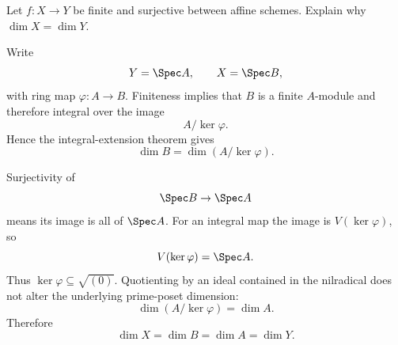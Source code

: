 \begin{problem}\label{prob:vi30-17}
Let \(f:X\to Y\) be finite and surjective between affine schemes. Explain why \(\dim X=\dim Y\).

\end{problem}

\ifdefined\FullProblemDossiers
\begin{solution}
Write
\[
Y=\Spec A,\qquad X=\Spec B,
\]
with ring map \(\varphi:A\to B\). Finiteness implies that \(B\) is a finite \(A\)-module and therefore integral
over the image
\[
A/\ker\varphi.
\]
Hence the integral-extension theorem gives
\[
\dim B=\dim(A/\ker\varphi).
\]

Surjectivity of
\[
\Spec B\to\Spec A
\]
means its image is all of \(\Spec A\). For an integral map the image is \(V(\ker\varphi)\), so
\[
V(\ker\varphi)=\Spec A.
\]
Thus \(\ker\varphi\subseteq\sqrt{(0)}\). Quotienting by an ideal contained in the nilradical does not alter the
underlying prime-poset dimension:
\[
\dim(A/\ker\varphi)=\dim A.
\]
Therefore
\[
\boxed{\dim X=\dim B=\dim A=\dim Y}.
\]
\end{solution}
\fi
